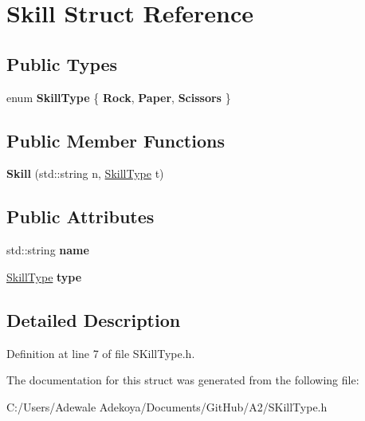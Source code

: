 \hypertarget{struct_skill}{}\section{Skill Struct Reference}
\label{struct_skill}
\subsection*{Public Types}
\begin{DoxyCompactItemize}
\item 
\hypertarget{struct_skill_a460934d44040fda3fdbb9aff24cfe80f}{}enum {\bfseries Skill\+Type} \{ {\bfseries Rock}, 
{\bfseries Paper}, 
{\bfseries Scissors}
 \}\label{struct_skill_a460934d44040fda3fdbb9aff24cfe80f}

\end{DoxyCompactItemize}
\subsection*{Public Member Functions}
\begin{DoxyCompactItemize}
\item 
\hypertarget{struct_skill_a78a3b5201189083059e568bdef2606a2}{}{\bfseries Skill} (std\+::string n, \hyperlink{class_skill_type}{Skill\+Type} t)\label{struct_skill_a78a3b5201189083059e568bdef2606a2}

\end{DoxyCompactItemize}
\subsection*{Public Attributes}
\begin{DoxyCompactItemize}
\item 
\hypertarget{struct_skill_a1271744546e69259d6ac31013900c49e}{}std\+::string {\bfseries name}\label{struct_skill_a1271744546e69259d6ac31013900c49e}

\item 
\hypertarget{struct_skill_a8deae6639996545a133cf1b17d082425}{}\hyperlink{class_skill_type}{Skill\+Type} {\bfseries type}\label{struct_skill_a8deae6639996545a133cf1b17d082425}

\end{DoxyCompactItemize}


\subsection{Detailed Description}


Definition at line 7 of file S\+Kill\+Type.\+h.



The documentation for this struct was generated from the following file\+:\begin{DoxyCompactItemize}
\item 
C\+:/\+Users/\+Adewale Adekoya/\+Documents/\+Git\+Hub/\+A2/S\+Kill\+Type.\+h\end{DoxyCompactItemize}
